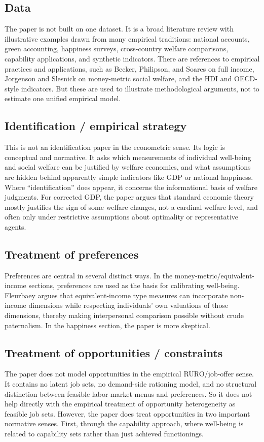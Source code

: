 \documentclass[11pt,a4paper]{article}
\begin{document}
\subsection*{Data}
The paper is not built on one dataset. It is a broad literature review with illustrative examples drawn from many empirical traditions: national accounts, green accounting, happiness surveys, cross-country welfare comparisons, capability applications, and synthetic indicators. There are references to empirical practices and applications, such as Becker, Philipson, and Soares on full income, Jorgenson and Slesnick on money-metric social welfare, and the HDI and OECD-style indicators. But these are used to illustrate methodological arguments, not to estimate one unified empirical model.

\subsection*{Identification / empirical strategy}
This is not an identification paper in the econometric sense. Its logic is conceptual and normative. It asks which measurements of individual well-being and social welfare can be justified by welfare economics, and what assumptions are hidden behind apparently simple indicators like GDP or national happiness. Where “identification” does appear, it concerns the informational basis of welfare judgments. For corrected GDP, the paper argues that standard economic theory mostly justifies the sign of some welfare changes, not a cardinal welfare level, and often only under restrictive assumptions about optimality or representative agents.

\subsection*{Treatment of preferences}
Preferences are central in several distinct ways. In the money-metric/equivalent-income sections, preferences are used as the basis for calibrating well-being. Fleurbaey argues that equivalent-income type measures can incorporate non-income dimensions while respecting individuals’ own valuations of those dimensions, thereby making interpersonal comparison possible without crude paternalism. In the happiness section, the paper is more skeptical.

\subsection*{Treatment of opportunities / constraints}
The paper does not model opportunities in the empirical RURO/job-offer sense. It contains no latent job sets, no demand-side rationing model, and no structural distinction between feasible labor-market menus and preferences. So it does not help directly with the empirical treatment of opportunity heterogeneity as feasible job sets. However, the paper does treat opportunities in two important normative senses. First, through the capability approach, where well-being is related to capability sets rather than just achieved functionings.
\end{document}
